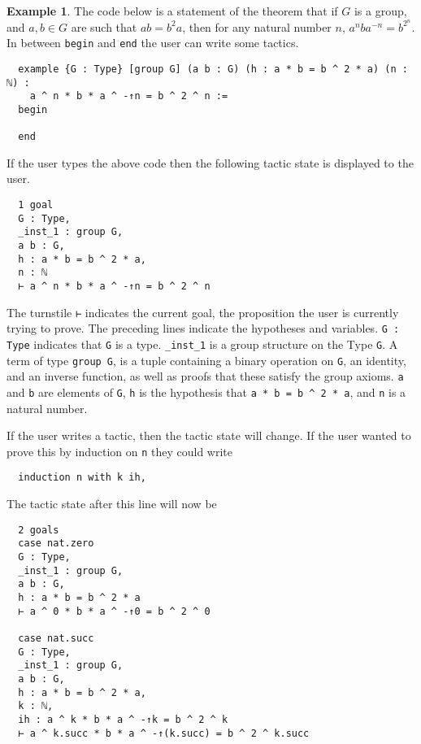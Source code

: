 \documentclass[12pt]{article} %
\theoremstyle{definition}
\theoremstyle{definition}
\theoremstyle{definition}
\theoremstyle{definition}
\theoremstyle{definition}
\theoremstyle{definition}
\newtheorem{exmpl}{Example}[theorem]
\begin{document}
\begin{exmpl}

The code below is a statement of the theorem that if $G$ is a group, and
$a, b ∈ G$ are such that $ab = b^2a$, then for any natural number $n$,
$a^nba^{-n} = b^{2^n}$. In between \lstinline{begin} and \lstinline{end} the user
can write some tactics.

\begin{lstlisting}
  example {G : Type} [group G] (a b : G) (h : a * b = b ^ 2 * a) (n : ℕ) :
    a ^ n * b * a ^ -↑n = b ^ 2 ^ n :=
  begin

  end
\end{lstlisting}
If the user types the above code then the following tactic state is displayed to the user.

\begin{lstlisting}
  1 goal
  G : Type,
  _inst_1 : group G,
  a b : G,
  h : a * b = b ^ 2 * a,
  n : ℕ
  ⊢ a ^ n * b * a ^ -↑n = b ^ 2 ^ n
\end{lstlisting}

The turnstile \lstinline{⊢} indicates the current goal, the proposition the user
is currently trying to prove. The preceding lines indicate the hypotheses and variables.
\lstinline{G : Type} indicates that \lstinline{G} is a type.
\lstinline{_inst_1} is a group structure on the Type \lstinline{G}.
A term of type \lstinline{group G}, is a tuple containing a binary operation on
\lstinline{G}, an identity, and an inverse function, as well as proofs that these
satisfy the group axioms. \lstinline{a} and \lstinline{b} are elements of
\lstinline{G}, \lstinline{h} is the hypothesis that \lstinline{a * b = b ^ 2 * a},
and \lstinline{n} is a natural number.

If the user writes a tactic, then the tactic state will change. If the user
wanted to prove this by induction on \lstinline{n} they could write

\begin{lstlisting}
  induction n with k ih,
\end{lstlisting}

The tactic state after this line will now be

\begin{lstlisting}
  2 goals
  case nat.zero
  G : Type,
  _inst_1 : group G,
  a b : G,
  h : a * b = b ^ 2 * a
  ⊢ a ^ 0 * b * a ^ -↑0 = b ^ 2 ^ 0

  case nat.succ
  G : Type,
  _inst_1 : group G,
  a b : G,
  h : a * b = b ^ 2 * a,
  k : ℕ,
  ih : a ^ k * b * a ^ -↑k = b ^ 2 ^ k
  ⊢ a ^ k.succ * b * a ^ -↑(k.succ) = b ^ 2 ^ k.succ
\end{lstlisting}


\end{exmpl}
\end{document}
